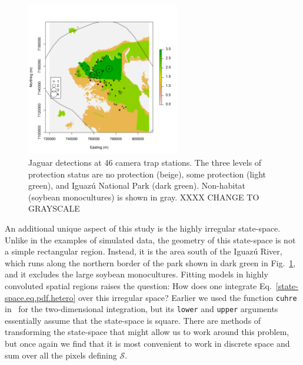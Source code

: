 \begin{figure}%
\centering
\includegraphics[width=0.6\textwidth]{Ch11-Statespace/figs/jaguarCountMap}
\caption{Jaguar detections at 46 camera trap stations. The three levels of
  protection status are no protection (beige), some protection (light
  green), and Iguaz\'{u} National Park (dark green). Non-habitat
  (soybean monocultures) is shown in gray. XXXX CHANGE TO GRAYSCALE}
\label{state-space.fig.jaguarCts}
\end{figure}

An additional unique aspect of this study is the highly irregular
state-space. Unlike in the examples of simulated data, the
geometry of this state-space is not a simple rectangular
region. Instead, it is the
area south of the Iguaz\'{u} River, which runs along the northern border
of the park shown in dark green in
Fig.~\ref{state-space.fig.jaguarCts}, and it excludes the large
soybean monocultures.
Fitting models in highly convoluted spatial regions raises
the question: How does one integrate
Eq.~\ref{state-space.eq.pdf.hetero} over this irregular space? Earlier we used the function \verb+cuhre+ in
\R~for the two-dimensional integration, but its \verb+lower+ and
\verb+upper+ arguments essentially assume that the state-space is
square. There are methods of transforming the state-space that might
allow us to work around this problem, but once again we find that it
is most convenient to work in discrete space and sum over all the pixels defining
$\mathcal{S}$.

